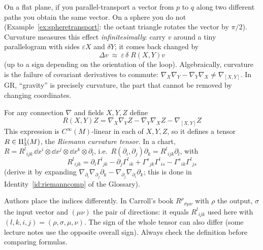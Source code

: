 \begin{intuition}[{curvature = failure of parallel transport to be path independent}]
On a flat plane, if you parallel-transport a vector from $p$ to $q$ along two different paths you obtain the same vector. On a sphere you do not (Example~\ref{ex:spheretransport}: the octant triangle rotates the vector by $\pi/2$). Curvature measures this effect \emph{infinitesimally}: carry $v$ around a tiny parallelogram with sides $\varepsilon X$ and $\delta Y$; it comes back changed by
\[
\Delta v\ \approx\ \varepsilon\,\delta\; R(X,Y)v
\]
(up to a sign depending on the orientation of the loop). Algebraically, curvature is the failure of covariant derivatives to commute: $\nabla_X\nabla_Y-\nabla_Y\nabla_X\neq\nabla_{[X,Y]}$. In GR, ``gravity'' is precisely curvature, the part that cannot be removed by changing coordinates.
\end{intuition}

\begin{formal}
For any connection $\nabla$ and fields $X,Y,Z$ define
\[
\boxed{\ R(X,Y)Z=\nabla_X\nabla_YZ-\nabla_Y\nabla_XZ-\nabla_{[X,Y]}Z\ }
\]
This expression is $C^\infty(M)$-linear in each of $X,Y,Z$, so it defines a tensor $R\in\Pi^{1}_{3}(M)$, the \emph{Riemann curvature tensor}. In a chart, $R=R^l{}_{ijk}\,\dd x^i\otimes\dd x^j\otimes\dd x^k\otimes\partial_l$, i.e.\ $R(\partial_i,\partial_j)\partial_k=R^l{}_{ijk}\partial_l$, with
\begin{equation}\label{eq:riemanncomp}
\boxed{\ R^l{}_{ijk}=\partial_i\Gamma^l{}_{jk}-\partial_j\Gamma^l{}_{ik}+\Gamma^s{}_{jk}\Gamma^l{}_{is}-\Gamma^s{}_{ik}\Gamma^l{}_{js}\ }
\end{equation}
(derive it by expanding $\nabla_{\partial_i}\nabla_{\partial_j}\partial_k-\nabla_{\partial_j}\nabla_{\partial_i}\partial_k$; this is done in Identity~\ref{id:riemanncomp} of the Glossary).%
\end{formal}
\begin{pitfall}[{index conventions}]
Authors place the indices differently. In Carroll's book \cite{Carroll} $R^\rho{}_{\sigma\mu\nu}$ with $\rho$ the output, $\sigma$ the input vector and $(\mu\nu)$ the pair of directions: it equals $R^l{}_{ijk}$ used here with $(l,k,i,j)=(\rho,\sigma,\mu,\nu)$. The sign of the whole tensor can also differ (some lecture notes use the opposite overall sign). Always check the definition before comparing formulas.
\end{pitfall}
